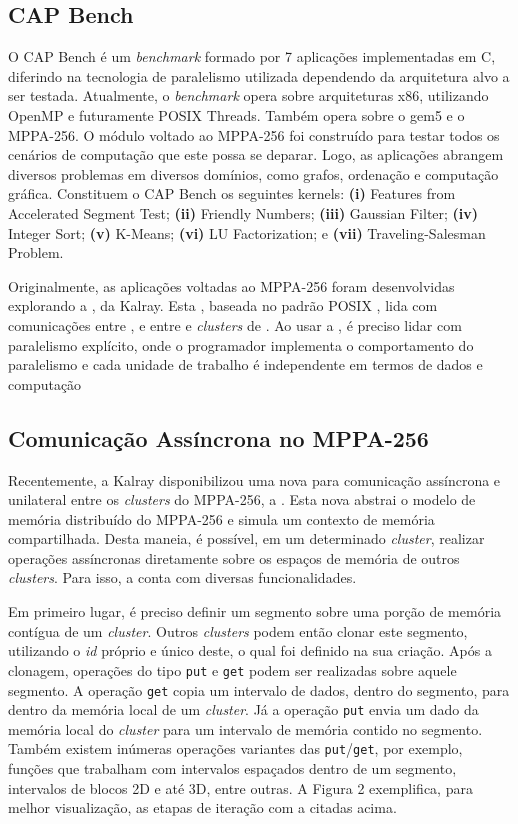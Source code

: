 \documentclass[a4paper,11pt]{article}
\newcommand{\mppa}{MPPA-256\xspace}
\newcommand{\capb}{CAP Bench\xspace}
\begin{document}
\subsection{\capb}
\label{subsec:capb}

O \capb é um \textit{benchmark} formado por 7 aplicações implementadas em C, diferindo na tecnologia de paralelismo utilizada dependendo da arquitetura alvo a ser testada. Atualmente, o \textit{benchmark} opera sobre arquiteturas x86, utilizando OpenMP e futuramente POSIX Threads. Também opera sobre o gem5 e o \mppa. O módulo voltado ao \mppa foi construído para testar todos os cenários de computação que este possa se deparar. Logo, as aplicações abrangem diversos problemas em diversos domínios, como grafos, ordenação e computação gráfica. Constituem o \capb os seguintes kernels: \textbf{(i)} Features from Accelerated Segment Test; \textbf{(ii)} Friendly Numbers; \textbf{(iii)} Gaussian Filter; \textbf{(iv)} Integer Sort; \textbf{(v)} K-Means; \textbf{(vi)} LU Factorization; e \textbf{(vii)} Traveling-Salesman Problem.

Originalmente, as aplicações voltadas ao \mppa foram desenvolvidas explorando a \api \ipc, da Kalray. Esta \api, baseada no padrão POSIX \ipc, lida com comunicações entre \ccs, e entre \ccs e \textit{clusters} de \io. Ao usar a \ipc, é preciso lidar com paralelismo explícito, onde o programador implementa o comportamento do paralelismo e cada unidade de trabalho é independente em termos de dados e computação \cite{Castro-Souza-CCPE:2016}


\subsection{Comunicação Assíncrona no \mppa}
\label{subsec:async}

Recentemente, a Kalray disponibilizou uma nova \api para comunicação assíncrona e unilateral entre os \textit{clusters} do \mppa, a \async. Esta nova \api abstrai o modelo de memória distribuído do \mppa e simula um contexto de memória compartilhada. Desta maneia, é possível, em um determinado \textit{cluster}, realizar operações assíncronas diretamente sobre os espaços de memória de outros \textit{clusters}. Para isso, a \api conta com diversas funcionalidades.

Em primeiro lugar, é preciso definir um segmento sobre uma porção de memória contígua de um \textit{cluster}. Outros \textit{clusters} podem então clonar este segmento, utilizando o \textit{id} próprio e único deste, o qual foi definido na sua criação. Após a clonagem, operações do tipo \texttt{put} e \texttt{get} podem ser realizadas sobre aquele segmento. A operação \texttt{get} copia um intervalo de dados, dentro do segmento, para dentro da memória local de um \textit{cluster}. Já a operação \texttt{put} envia um dado da memória local do \textit{cluster} para um intervalo de memória contido no segmento. Também existem inúmeras operações variantes das \texttt{put}/\texttt{get}, por exemplo, funções que trabalham com intervalos espaçados dentro de um segmento, intervalos de blocos 2D e até 3D, entre outras. A Figura 2 exemplifica, para melhor visualização, as etapas de iteração com a \api \async citadas acima.
\end{document}

